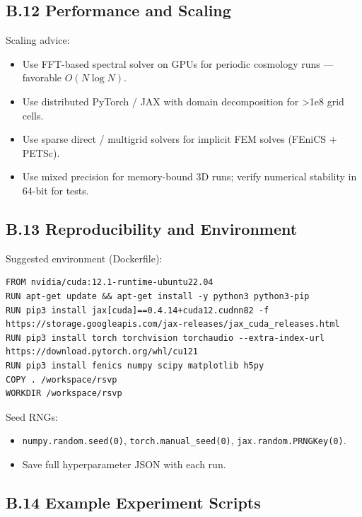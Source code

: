 \documentclass[11pt,a4paper]{article}
\begin{document}
\subsection{B.12 Performance and Scaling}

Scaling advice:

\begin{itemize}
  \item Use FFT-based spectral solver on GPUs for periodic cosmology runs — favorable \(O(N\log N)\).
  \item Use distributed PyTorch / JAX with domain decomposition for >1e8 grid cells.
  \item Use sparse direct / multigrid solvers for implicit FEM solves (FEniCS + PETSc).
  \item Use mixed precision for memory-bound 3D runs; verify numerical stability in 64-bit for tests.
\end{itemize}

\subsection{B.13 Reproducibility and Environment}

Suggested environment (Dockerfile):

\begin{verbatim}
FROM nvidia/cuda:12.1-runtime-ubuntu22.04
RUN apt-get update && apt-get install -y python3 python3-pip
RUN pip3 install jax[cuda]==0.4.14+cuda12.cudnn82 -f https://storage.googleapis.com/jax-releases/jax_cuda_releases.html
RUN pip3 install torch torchvision torchaudio --extra-index-url https://download.pytorch.org/whl/cu121
RUN pip3 install fenics numpy scipy matplotlib h5py
COPY . /workspace/rsvp
WORKDIR /workspace/rsvp
\end{verbatim}

Seed RNGs:

\begin{itemize}
  \item \texttt{numpy.random.seed(0)}, \texttt{torch.manual\_seed(0)}, \texttt{jax.random.PRNGKey(0)}.
  \item Save full hyperparameter JSON with each run.
\end{itemize}

\subsection{B.14 Example Experiment Scripts}
\end{document}
